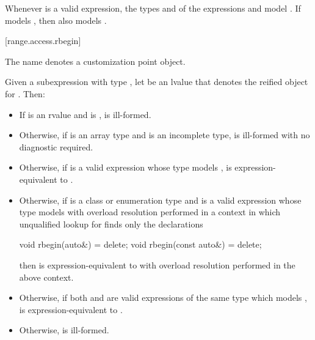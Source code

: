\pnum
\begin{note}
Whenever  is a valid expression,
the types  and  of the expressions
 and 
model .
If  models ,
then  also models .
\end{note}

[range.access.rbegin]{}
%

\pnum
The name  denotes a customization point
object.

\pnum
Given a subexpression  with type ,
let  be an lvalue that denotes the reified object for .
Then:

\begin{itemize}
\item
  If  is an rvalue and
   is ,
   is ill-formed.

\item
  Otherwise, if  is an array type and
   is an incomplete type,
   is ill-formed with no diagnostic required.

\item
  Otherwise, if 
  is a valid expression whose type models
  ,
   is expression-equivalent to
  .

\item
  Otherwise, if  is a class or enumeration type and
  is a valid expression whose type models
  with overload resolution performed in a context in which
  unqualified lookup for  finds only the declarations
\begin{codeblock}
void rbegin(auto&) = delete;
void rbegin(const auto&) = delete;
\end{codeblock}
  then  is expression-equivalent to
  with overload resolution performed in the above context.

\item
  Otherwise, if both  and 
  are valid expressions of the same type which models
  ,
   is expression-equivalent to
  .

\item
  Otherwise,  is ill-formed.
\end{itemize}

